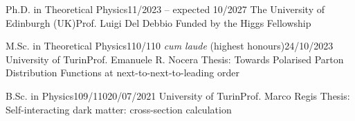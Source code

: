 
  {Ph.D. in Theoretical Physics}{}{11/2023 – expected 10/2027}
  {The University of Edinburgh (UK)}{Prof. Luigi Del Debbio}
  {Funded by the Higgs Fellowship}

  {M.Sc. in Theoretical Physics}{110/110 \textit{cum laude} (highest honours)}{24/10/2023}
  {University of Turin}{Prof. Emanuele R. Nocera}
  {Thesis: Towards Polarised Parton Distribution Functions at next-to-next-to-leading order}

  {B.Sc. in Physics}{109/110}{20/07/2021}
  {University of Turin}{Prof. Marco Regis}
  {Thesis: Self-interacting dark matter: cross-section calculation}

